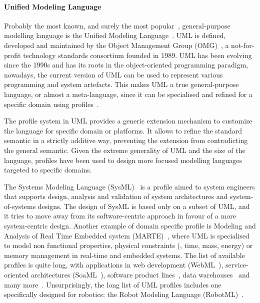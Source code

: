 \paragraph{Unified Modeling Language} Probably the most known, and surely the most popular~\cite{malavolta2012industry}, general-purpose modelling language is the Unified Modeling Language~\cite{rumbaugh2004unified}. UML is defined, developed and maintained by the Object Management Group (OMG)~\cite{omg}, a not-for-profit technology standards consortium founded in 1989. UML has been evolving since the 1990s and has its roots in the object-oriented programming paradigm, nowadays, the current version of UML can be used to represent various programming and system artefacts. This makes UML a true general-purpose language, or almost a meta-language, since it can be specialised and refined for a specific domain using profiles~\cite{fuentes2004introduction}. 

The profile system in UML provides a generic extension mechanism to customize the language for specific domain or platforms. It allows to refine the standard semantic in a strictly additive way, preventing the extension from contradicting the general semantic. Given the extreme generality of UML and the size of the language, profiles have been used to design more focused modelling languages targeted to specific domains.

The Systems Modeling Language (SysML)~\cite{friedenthal2014practical} is a profile aimed to system engineers that supports design, analysis and validation of system architectures and system-of-systems designs. The design of SysML is based only on a subset of UML, and it tries to move away from its software-centric approach in favour of a more system-centric design. Another example of domain specific profile is Modeling and Analysis of Real Time Embedded system (MARTE)~\cite{faugere2007marte}, where UML is specialised to model non functional properties, physical constraints (\eg, time, mass, energy) or memory management in real-time and embedded systems. The list of available profiles is quite long, with applications in web development (WebML~\cite{ceri2000web}), service-oriented architectures (SoaML~\cite{elvesaeter2011model}), software product lines~\cite{ziadi2003towards}, data warehouses~\cite{lujan2006uml} and many more~\cite{fontoura2000uml, aldawud2001uml}. Unsurprisingly, the long list of UML profiles includes one specifically designed for robotics: the Robot Modeling Language (RobotML)~\cite{dhouib2012robotml}.


